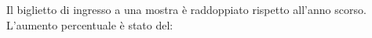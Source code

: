 Il biglietto di ingresso a una mostra è raddoppiato
rispetto all'anno scorso. L'aumento percentuale è stato del: